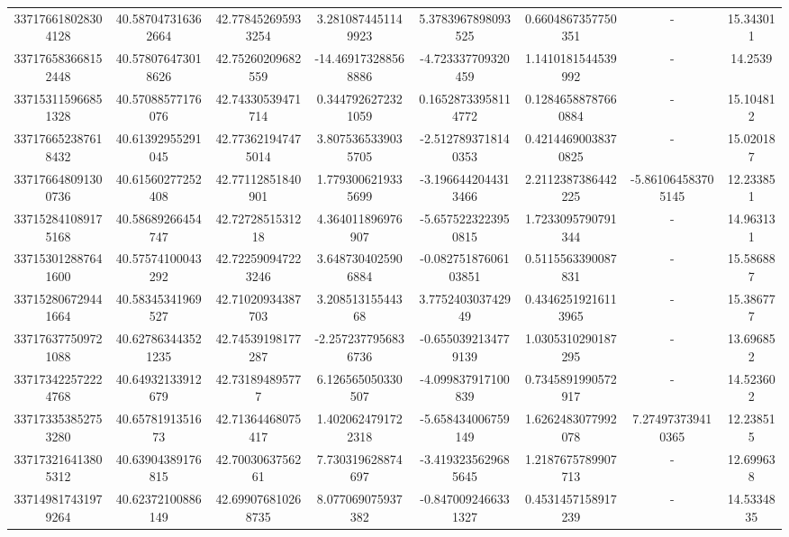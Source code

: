 \documentclass{article}
\begin{document}
\begin{landscape}
\begin{longtable}[c]{S[table-format=18.0]S[table-format=2.15]S[table-format=2.15]S[table-format=-2.17]S[table-format=-2.16]S[table-format=-2.16]S[table-format=-3.16]S[table-format=2.7]}
337176618028304128 & 40.587047316362664 & 42.778452695933254 & 3.2810874451149923    & 5.3783967898093525   & 0.6604867357750351   & {-}                  & 15.343011  \\
337176583668152448 & 40.578076473018626 & 42.75260209682559  & -14.469173288568886   & -4.723337709320459   & 1.1410181544539992   & {-}                  & 14.2539    \\
337153115966851328 & 40.57088577176076  & 42.74330539471714  & 0.3447926272321059    & 0.16528733958114772  & 0.12846588787660884  & {-}                  & 15.104812  \\
337176652387618432 & 40.61392955291045  & 42.773621947475014 & 3.8075365339035705    & -2.5127893718140353  & 0.42144690038370825  & {-}                  & 15.020187  \\
337176648091300736 & 40.61560277252408  & 42.77112851840901  & 1.7793006219335699    & -3.1966442044313466  & 2.2112387386442225   & -5.861064583705145  & 12.233851  \\
337152841089175168 & 40.58689266454747  & 42.7272851531218   & 4.364011896976907     & -5.6575223223950815  & 1.7233095790791344   & {-}                  & 14.963131  \\
337153012887641600 & 40.57574100043292  & 42.722590947223246 & 3.6487304025906884    & -0.08275187606103851 & 0.5115563390087831   & {-}                  & 15.586887  \\
337152806729441664 & 40.58345341969527  & 42.71020934387703  & 3.20851315544368      & 3.775240303742949    & 0.43462519216113965  & {-}                  & 15.386777  \\
337176377509721088 & 40.627863443521235 & 42.74539198177287  & -2.2572377956836736   & -0.6550392134779139  & 1.0305310290187295   & {-}                  & 13.696852  \\
337173422572224768 & 40.64932133912679  & 42.731894895777    & 6.126565050330507     & -4.099837917100839   & 0.7345891990572917   & {-}                  & 14.523602  \\
337173353852753280 & 40.6578191351673   & 42.71364468075417  & 1.4020624791722318    & -5.658434006759149   & 1.6262483077992078   & 7.274973739410365   & 12.238515  \\
337173216413805312 & 40.63904389176815  & 42.7003063756261   & 7.730319628874697     & -3.4193235629685645  & 1.2187675789907713   & {-}                  & 12.699638  \\
337149817431979264 & 40.62372100886149  & 42.699076810268735 & 8.077069075937382     & -0.8470092466331327  & 0.4531457158917239   & {-}                  & 14.5334835 \\

\end{longtable}
\end{landscape}
\end{document}

